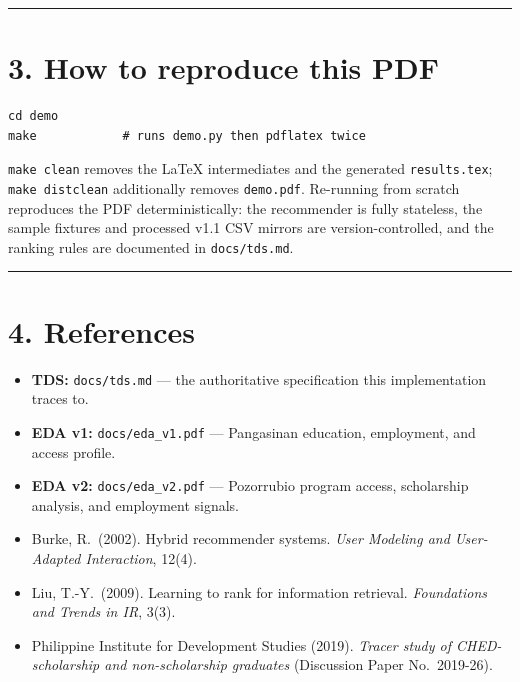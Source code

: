 \documentclass[11pt,a4paper]{article}
\begin{document}


\vspace{1em}
\hrule
\vspace{0.5em}

\section*{3. How to reproduce this PDF}

\begin{verbatim}
cd demo
make            # runs demo.py then pdflatex twice
\end{verbatim}

\noindent
\texttt{make clean} removes the LaTeX intermediates and the generated
\texttt{results.tex}; \texttt{make distclean} additionally removes
\texttt{demo.pdf}. Re-running from scratch reproduces the PDF
deterministically: the recommender is fully stateless, the sample fixtures
and processed v1.1 CSV mirrors are version-controlled, and the ranking rules
are documented in \texttt{docs/tds.md}.

\vspace{0.5em}
\hrule
\vspace{0.5em}

\section*{4. References}

\begin{itemize}\setlength\itemsep{0.15em}
  \item \textbf{TDS:} \texttt{docs/tds.md} --- the authoritative
        specification this implementation traces to.
  \item \textbf{EDA v1:} \texttt{docs/eda\_v1.pdf} --- Pangasinan
        education, employment, and access profile.
  \item \textbf{EDA v2:} \texttt{docs/eda\_v2.pdf} --- Pozorrubio
        program access, scholarship analysis, and employment signals.
  \item Burke, R.\ (2002). Hybrid recommender systems.
        \emph{User Modeling and User-Adapted Interaction}, 12(4).
  \item Liu, T.-Y.\ (2009). Learning to rank for information
        retrieval. \emph{Foundations and Trends in IR}, 3(3).
  \item Philippine Institute for Development Studies (2019).
        \emph{Tracer study of CHED-scholarship and non-scholarship
        graduates} (Discussion Paper No.\ 2019-26).
\end{itemize}
\end{document}

